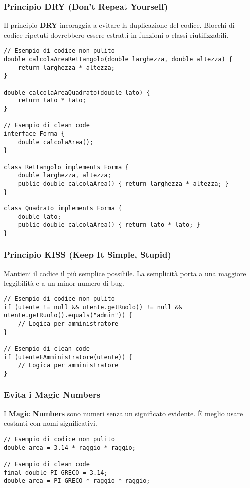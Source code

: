 \documentclass{article}
\begin{document}
\subsubsection{Principio DRY (Don't Repeat Yourself)}
Il principio \textbf{DRY} incoraggia a evitare la duplicazione del codice. Blocchi di codice ripetuti dovrebbero essere estratti in funzioni o classi riutilizzabili.
\begin{lstlisting}
// Esempio di codice non pulito
double calcolaAreaRettangolo(double larghezza, double altezza) {
    return larghezza * altezza;
}

double calcolaAreaQuadrato(double lato) {
    return lato * lato;
}

// Esempio di clean code
interface Forma {
    double calcolaArea();
}

class Rettangolo implements Forma {
    double larghezza, altezza;
    public double calcolaArea() { return larghezza * altezza; }
}

class Quadrato implements Forma {
    double lato;
    public double calcolaArea() { return lato * lato; }
}
\end{lstlisting}

\subsubsection{Principio KISS (Keep It Simple, Stupid)}
Mantieni il codice il più semplice possibile. La semplicità porta a una maggiore leggibilità e a un minor numero di bug.
\begin{lstlisting}
// Esempio di codice non pulito
if (utente != null && utente.getRuolo() != null && utente.getRuolo().equals("admin")) {
    // Logica per amministratore
}

// Esempio di clean code
if (utenteEAmministratore(utente)) {
    // Logica per amministratore
}
\end{lstlisting}

\subsubsection{Evita i Magic Numbers}
I \textbf{Magic Numbers} sono numeri senza un significato evidente. È meglio usare costanti con nomi significativi.
\begin{lstlisting}
// Esempio di codice non pulito
double area = 3.14 * raggio * raggio;

// Esempio di clean code
final double PI_GRECO = 3.14;
double area = PI_GRECO * raggio * raggio;
\end{lstlisting}
\end{document}
